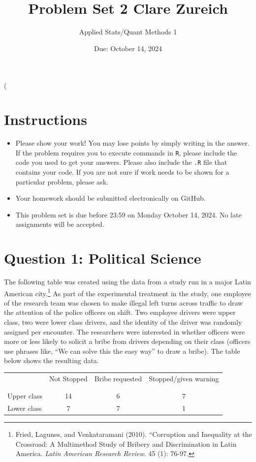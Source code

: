 \left( \documentclass[12pt,letterpaper]{article}
\title{Problem Set 2 Clare Zureich}
\date{Due: October 14, 2024}
\author{Applied Stats/Quant Methods 1}
\begin{document}
	\maketitle
	\section*{Instructions}
\begin{itemize}
	\item Please show your work! You may lose points by simply writing in the answer. If the problem requires you to execute commands in \texttt{R}, please include the code you used to get your answers. Please also include the \texttt{.R} file that contains your code. If you are not sure if work needs to be shown for a particular problem, please ask.
	\item Your homework should be submitted electronically on GitHub.
	\item This problem set is due before 23:59 on Monday October 14, 2024. No late assignments will be accepted.

\end{itemize}

	
	\vspace{.5cm}
	\section*{Question 1: Political Science}
		\vspace{.25cm}
	The following table was created using the data from a study run in a major Latin American city.\footnote{Fried, Lagunes, and Venkataramani (2010). ``Corruption and Inequality at the Crossroad: A Multimethod Study of Bribery and Discrimination in Latin America. \textit{Latin American Research Review}. 45 (1): 76-97.} As part of the experimental treatment in the study, one employee of the research team was chosen to make illegal left turns across traffic to draw the attention of the police officers on shift. Two employee drivers were upper class, two were lower class drivers, and the identity of the driver was randomly assigned per encounter. The researchers were interested in whether officers were more or less likely to solicit a bribe from drivers depending on their class (officers use phrases like, ``We can solve this the easy way'' to draw a bribe). The table below shows the resulting data.

\newpage
\begin{table}[h!]
	\centering
	\begin{tabular}{l | c c c }
		& Not Stopped & Bribe requested & Stopped/given warning \\
		\\[-1.8ex] 
		\hline \\[-1.8ex]
		Upper class & 14 & 6 & 7 \\
		Lower class & 7 & 7 & 1 \\
		\hline
	\end{tabular}
\end{table}
\end{document}
